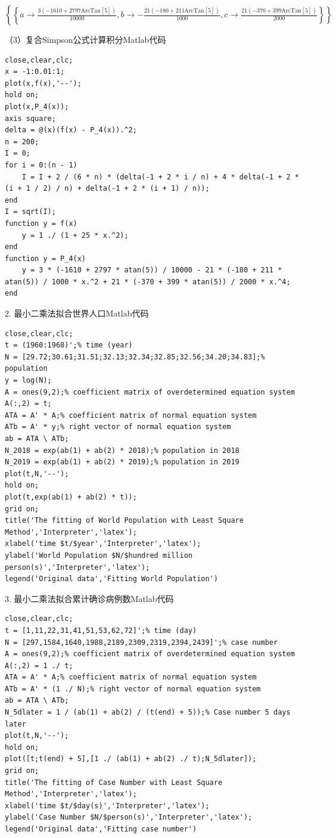 \documentclass[10pt,a4paper]{article}
\begin{document}
\begin{doublespace}
\noindent\(\left\{\left\{a\to \frac{3 (-1610+2797 \text{ArcTan}[5])}{10000},b\to -\frac{21 (-180+211 \text{ArcTan}[5])}{1000},c\to \frac{21 (-370+399
\text{ArcTan}[5])}{2000}\right\}\right\}\)
\end{doublespace}

\noindent（3）复合Simpson公式计算积分Matlab代码
\begin{lstlisting}
close,clear,clc;
x = -1:0.01:1;
plot(x,f(x),'--');
hold on;
plot(x,P_4(x));
axis square;
delta = @(x)(f(x) - P_4(x)).^2;
n = 200;
I = 0;
for i = 0:(n - 1)
    I = I + 2 / (6 * n) * (delta(-1 + 2 * i / n) + 4 * delta(-1 + 2 * (i + 1 / 2) / n) + delta(-1 + 2 * (i + 1) / n));
end
I = sqrt(I);
function y = f(x)
    y = 1 ./ (1 + 25 * x.^2);
end
function y = P_4(x)
    y = 3 * (-1610 + 2797 * atan(5)) / 10000 - 21 * (-180 + 211 * atan(5)) / 1000 * x.^2 + 21 * (-370 + 399 * atan(5)) / 2000 * x.^4;
end
\end{lstlisting}
2. 最小二乘法拟合世界人口Matlab代码
\begin{lstlisting}
close,clear,clc;
t = (1960:1968)';% time (year)
N = [29.72;30.61;31.51;32.13;32.34;32.85;32.56;34.20;34.83];% population
y = log(N);
A = ones(9,2);% coefficient matrix of overdetermined equation system
A(:,2) = t;
ATA = A' * A;% coefficient matrix of normal equation system
ATb = A' * y;% right vector of normal equation system
ab = ATA \ ATb;
N_2018 = exp(ab(1) + ab(2) * 2018);% population in 2018
N_2019 = exp(ab(1) + ab(2) * 2019);% population in 2019
plot(t,N,'--');
hold on;
plot(t,exp(ab(1) + ab(2) * t));
grid on;
title('The fitting of World Population with Least Square Method','Interpreter','latex');
xlabel('time $t/$year','Interpreter','latex');
ylabel('World Population $N/$hundred million person(s)','Interpreter','latex');
legend('Original data','Fitting World Population')
\end{lstlisting}
3. 最小二乘法拟合累计确诊病例数Matlab代码
\begin{lstlisting}
close,clear,clc;
t = [1,11,22,31,41,51,53,62,72]';% time (day)
N = [297,1584,1640,1988,2189,2309,2319,2394,2439]';% case number
A = ones(9,2);% coefficient matrix of overdetermined equation system
A(:,2) = 1 ./ t;
ATA = A' * A;% coefficient matrix of normal equation system
ATb = A' * (1 ./ N);% right vector of normal equation system
ab = ATA \ ATb;
N_5dlater = 1 / (ab(1) + ab(2) / (t(end) + 5));% Case number 5 days later
plot(t,N,'--');
hold on;
plot([t;t(end) + 5],[1 ./ (ab(1) + ab(2) ./ t);N_5dlater]);
grid on;
title('The fitting of Case Number with Least Square Method','Interpreter','latex');
xlabel('time $t/$day(s)','Interpreter','latex');
ylabel('Case Number $N/$person(s)','Interpreter','latex');
legend('Original data','Fitting case number')
\end{lstlisting}
\end{document}
